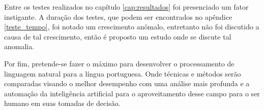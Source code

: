 Entre os testes realizados no capítulo \ref{cap:resultados} foi presenciado um fator instigante. A duração dos testes,  que podem ser encontrados no apêndice \ref{teste_tempo},  foi notado um crescimento anômalo, entretanto não foi discutido a causa de tal crescimento, então é proposto um estudo onde se discute tal anomalia. 

Por fim, pretende-se fazer o máximo para desenvolver o  processamento de linguagem natural para a língua portuguesa. Onde técnicas e métodos serão comparadas visando o melhor desempenho com uma análise mais profunda e a automação da inteligência artificial para o aproveitamento desse campo para o ser humano em suas tomadas de decisão. 
